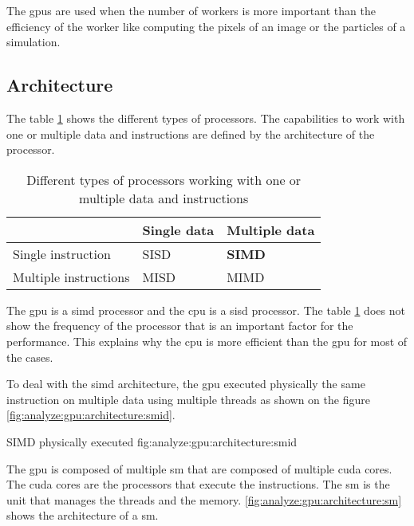 The \acrshort{gpu}s are used when the number of workers is more important than
the efficiency of the worker like computing the pixels of an image or the
particles of a simulation.




\subsection{Architecture}
\label{ch:analyze:gpu:architecture}

The table \ref{tab:analyze:gpu:architecture:instruction-data} shows the
different types of processors.
The capabilities to work with one or multiple data and instructions are defined
by the architecture of the processor.

\begin{table}[ht]
    \centering
    \begin{tabular}{l|l|l|}
                          & Single data & Multiple data \\ \hline
    Single instruction    & SISD        & \textbf{SIMD}  \\ \hline
    Multiple instructions & MISD        & MIMD           \\ \hline
    \end{tabular}
    \caption{Different types of processors working with one or multiple data and instructions}
    \label{tab:analyze:gpu:architecture:instruction-data}
\end{table}

The \acrshort{gpu} is a \acrshort{simd} processor and the \acrshort{cpu} is a
\acrshort{sisd} processor.
The table \ref{tab:analyze:gpu:architecture:instruction-data} does not show the
frequency of the processor that is an important factor for the performance.
This explains why the \acrshort{cpu} is more efficient than the \acrshort{gpu}
for most of the cases.

To deal with the \acrshort{simd} architecture, the \acrshort{gpu} executed
physically the same instruction on multiple data using multiple threads as shown
on the figure \ref{fig:analyze:gpu:architecture:smid}.

{SIMD physically executed}
{fig:analyze:gpu:architecture:smid}

The \acrshort{gpu} is composed of multiple \acrfull{sm} that are composed of
multiple \acrfull{cuda} cores.
The \acrshort{cuda} cores are the processors that execute the instructions.
The \acrshort{sm} is the unit that manages the threads and the memory.
\ref{fig:analyze:gpu:architecture:sm} shows the architecture of a \acrshort{sm}.

